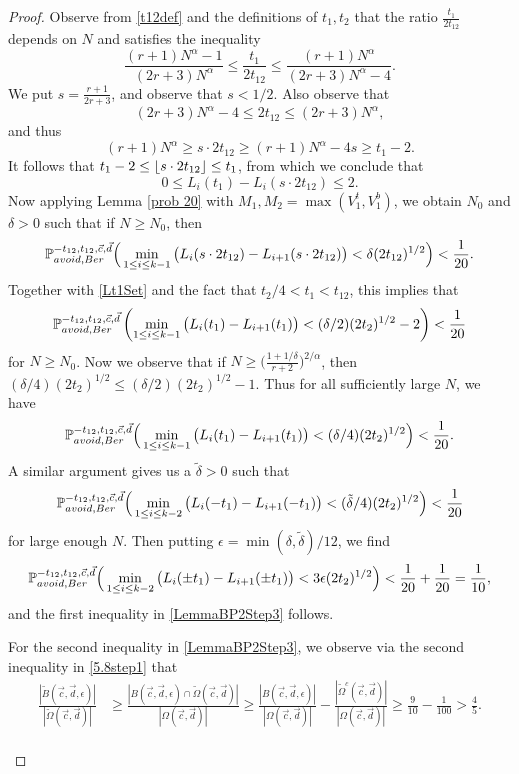 \begin{proof}
	Observe from \eqref{t12def} and the definitions of $t_1,t_2$ that the ratio $\frac{t_1}{2t_{12}}$ depends on $N$ and satisfies the inequality
	\[
	\frac{(r+1)N^\alpha-1}{(2r+3)N^\alpha}\leq \frac{t_1}{2t_{12}} \leq \frac{(r+1)N^\alpha}{(2r+3)N^\alpha-4}.
	\]
	We put $s = \frac{r+1}{2r+3}$, and observe that $s < 1/2$. Also observe that
	\[
	(2r+3)N^\alpha - 4\leq 2t_{12}\leq (2r+3)N^\alpha,
	\]
	and thus
	\[
	(r+1)N^\alpha \geq s\cdot 2t_{12} \geq (r+1)N^\alpha - 4s \geq t_1 - 2.
	\]
	It follows that $t_1 - 2 \leq \lfloor s\cdot 2t_{12}\rfloor \leq t_1$, from which we conclude that
	\begin{equation}\label{Lt1Set}
	0 \leq L_i(t_1)-L_i(s\cdot 2t_{12}) \leq 2.
	\end{equation}
	Now applying Lemma \ref{prob 20} with $M_1,M_2=\max(V_1^t,V_1^b)$, we obtain $N_0$ and $\delta>0$ such that if $N \geq N_0$, then
	\[
	\mathbb{P}^{-t_{12},t_{12},\vec c, \vec d}_{avoid,Ber}\Big(\min_{1\leq i\leq k-1} \big(L_i(s\cdot 2t_{12})-L_{i+1}(s\cdot 2t_{12})\big) < \delta(2t_{12})^{1/2}\Big)<\frac{1}{20}.
	\]
	Together with \eqref{Lt1Set} and the fact that $t_2/4 < t_1 < t_{12}$, this implies that
	\begin{equation}\label{step3delta/2}
	\mathbb{P}^{-t_{12},t_{12},\vec c, \vec d}_{avoid,Ber}\left(\min_{1\leq i\leq k-1} \big(L_i(t_1)-L_{i+1}(t_1)\big)<(\delta/2)(2t_2)^{1/2}-2\right)<\frac{1}{20}
	\end{equation}
	for $N\geq N_0$. Now we observe that if $N \geq \big(\frac{1+1/\delta}{r+2}\big)^{2/\alpha}$, then $(\delta/4)(2t_2)^{1/2} \leq (\delta/2)(2t_2)^{1/2} - 1$. Thus for all sufficiently large $N$, we have
	\[
	\mathbb{P}^{-t_{12},t_{12},\vec c, \vec d}_{avoid,Ber}\Big(\min_{1\leq i\leq k-1} \big(L_i(t_1)-L_{i+1}(t_1)\big)<(\delta/4)(2t_2)^{1/2}\Big)<\frac{1}{20}.
	\]
	A similar argument gives us a $\tilde{\delta}>0$ such that
	\[
	\mathbb{P}^{-t_{12},t_{12},\vec c, \vec d}_{avoid,Ber}\Big(\min_{1\leq i\leq k-2} \big(L_i(-t_1)-L_{i+1}(-t_1)\big)<(\tilde{\delta}/4)(2t_2)^{1/2}\Big)<\frac{1}{20}
	\]
	for large enough $N$. Then putting $\epsilon = \min(\delta,\tilde{\delta})/12$, we find
	\[
	\mathbb{P}^{-t_{12},t_{12},\vec c, \vec d}_{avoid,Ber}\Big(\min_{1\leq i\leq k-2} \big(L_i(\pm t_1)-L_{i+1}(\pm t_1)\big)<3\epsilon(2t_2)^{1/2}\Big) < \frac{1}{20} + \frac{1}{20} = \frac{1}{10},
	\] 
	and the first inequality in \eqref{LemmaBP2Step3} follows.
	
	For the second inequality in \eqref{LemmaBP2Step3}, we observe via the second inequality in \eqref{5.8step1} that
	\begin{align*}
	\frac{|\tilde{B}(\vec{c},\vec{d},\epsilon)|}{|\tilde{\Omega}(\vec{c},\vec{d})|} &\geq \frac{|B(\vec{c},\vec{d},\epsilon)\cap\tilde{\Omega}(\vec{c},\vec{d})|}{|\Omega(\vec{c},\vec{d})|} \geq \frac{|B(\vec{c},\vec{d},\epsilon)|}{|\Omega(\vec{c},\vec{d})|} -\frac{|\tilde{\Omega}^c(\vec{c},\vec{d})|}{|\Omega(\vec{c},\vec{d})|} \geq \frac{9}{10} - \frac{1}{100} > \frac{4}{5}.
	\end{align*} \\
	

\end{proof}
